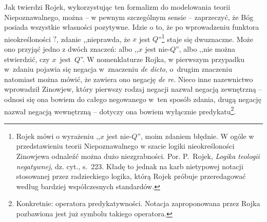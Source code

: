 Jak twierdzi Rojek, wykorzystując ten formalizm do modelowania teorii
Niepoznawalnego, można -- w pewnym szczególnym sensie -- zaprzeczyć, że
Bóg posiada wszystkie własności pozytywne.
Idzie o to, że po
wprowadzeniu funktora nieokreśloności $?$, zdanie
,,nieprawda, że $x$ jest
$Q$''\footnote{Rojek mówi o wyrażeniu ,,$x$ jest nie-$Q$'', moim zdaniem
błędnie. W ogóle w przedstawieniu teorii Niepoznawalnego w szacie logiki nieokreśloności Zinowjewa odnaleźć można dużo niezgrabności. Por. P.~Rojek, \textit{Logika teologii negatywnej}, dz. cyt., s.~223. Kładę to jednak na karb nietypowej notacji stosowanej przez radzieckiego logika, którą Rojek próbuje przeredagować według bardziej współczesnych standardów.} staje się dwuznaczne. Może ono przyjąć jedno
z dwóch znaczeń: albo ,,$x$ jest nie-$Q$'', albo ,,nie można stwierdzić, czy $x$~jest~$Q$''. W nomenklaturze Rojka, w pierwszym przypadku w~zdaniu pojawia
się negacja w~znaczeniu \textit{de dicto}, o~drugim znaczeniu natomiast
można mówić, że zawiera ono negację \textit{de re}. Nieco inne
nazewnictwo wprowadził Zinowjew, który pierwszy rodzaj negacji nazwał
negacją zewnętrzną -- odnosi się ona bowiem do całego negowanego w~ten
sposób zdania, drugą negację nazwał
negacją wewnętrzną -- dotyczy ona bowiem wyłącznie predykatu\footnote{Konkretnie: operatora predykatywności.
Notacja zaproponowana przez Rojka pozbawiona jest już symbolu takiego operatora.}.

